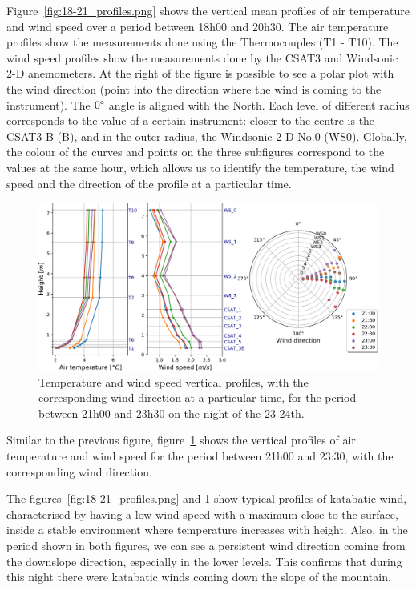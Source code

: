 Figure~\ref{fig:18-21_profiles.png} shows the vertical mean profiles of air temperature and wind speed over a period between 18h00 and 20h30. The air temperature profiles show the measurements done using the Thermocouples (T1 - T10). The wind speed profiles show the measurements done by the CSAT3 and Windsonic 2-D anemometers. At the right of the figure is possible to see a polar plot with the wind direction (point into the direction where the wind is coming to the instrument). The $0 \degree$ angle is aligned with the North. Each level of different radius corresponds to the value of a certain instrument: closer to the centre is the CSAT3-B (B), and in the outer radius, the Windsonic 2-D No.0 (WS0). Globally, the colour of the curves and points on the three subfigures correspond to the values at the same hour, which allows us to identify the temperature, the wind speed and the direction of the profile at a particular time.

\begin{figure}[!ht]
    \centering
    \includegraphics[width=1\textwidth]{fig/chapter_4/23-24/21-23_profiles.png}
    \caption{Temperature and wind speed vertical profiles, with the corresponding wind direction at a particular time, for the period between 21h00 and 23h30 on the night of the 23-24th.}
    \label{fig:21-23_profiles.png}
\end{figure}

Similar to the previous figure, figure~\ref{fig:21-23_profiles.png} shows the vertical profiles of air temperature and wind speed for the period between 21h00 and 23:30, with the corresponding wind direction.

The figures~\ref{fig:18-21_profiles.png} and \ref{fig:21-23_profiles.png} show typical profiles of katabatic wind, characterised by having a low
wind speed with a maximum close to the surface, inside a stable environment where temperature increases with height. Also, in the period shown in both figures, we can see a persistent wind direction coming from the downslope direction, especially in the lower levels. This confirms that during this night there were katabatic winds coming down the slope of the mountain. 


